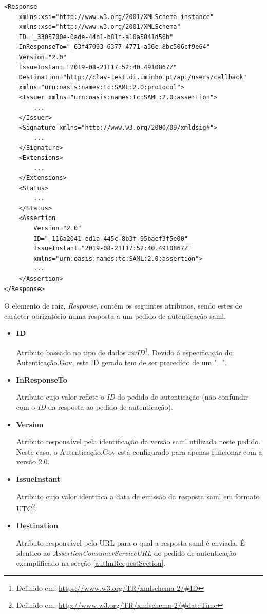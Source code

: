 \begin{lstlisting}
<Response 
    xmlns:xsi="http://www.w3.org/2001/XMLSchema-instance" 
    xmlns:xsd="http://www.w3.org/2001/XMLSchema" 
    ID="_3305700e-0ade-44b1-b81f-a10a5841d56b" 
    InResponseTo="_63f47093-6377-4771-a36e-8bc506cf9e64" 
    Version="2.0" 
    IssueInstant="2019-08-21T17:52:40.4910867Z" 
    Destination="http://clav-test.di.uminho.pt/api/users/callback"
    xmlns="urn:oasis:names:tc:SAML:2.0:protocol">
    <Issuer xmlns="urn:oasis:names:tc:SAML:2.0:assertion">
        ...
    </Issuer>
    <Signature xmlns="http://www.w3.org/2000/09/xmldsig#">
        ...
    </Signature>
    <Extensions>
        ...
    </Extensions>
    <Status>
        ...
    </Status>
    <Assertion 
        Version="2.0" 
        ID="_116a2041-ed1a-445c-8b3f-95baef3f5e00" 
        IssueInstant="2019-08-21T17:52:40.4910867Z" 
        xmlns="urn:oasis:names:tc:SAML:2.0:assertion">
        ...
    </Assertion>
</Response>
\end{lstlisting}

\vspace{-7mm}
O elemento de raiz, \emph{Response}, contém os seguintes atributos, sendo estes de carácter obrigatório numa resposta a um pedido de autenticação \gls{saml}.

\begin{itemize}
    \item \textbf{ID}
    
    Atributo baseado no tipo de dados \emph{xs:ID}\footnote{Definido em: \url{https://www.w3.org/TR/xmlschema-2/\#ID}}. Devido à especificação do Autenticação.Gov, este ID gerado tem de ser precedido de um "\_".
    
    \item \textbf{InResponseTo}
    
    Atributo cujo valor reflete o \emph{ID} do pedido de autenticação (não confundir com o \emph{ID} da resposta ao pedido de autenticação).
    
    \item \textbf{Version}
    
    Atributo responsável pela identificação da versão \gls{saml} utilizada neste pedido. Neste caso, o Autenticação.Gov está configurado para apenas funcionar com a versão 2.0.
    
    \item \textbf{IssueInstant}
    
    Atributo cujo valor identifica a data de emissão da resposta \gls{saml} em formato UTC\footnote{Definido em: \url{http://www.w3.org/TR/xmlschema-2/\#dateTime}}.
    
    \item \textbf{Destination}
    
    Atributo responsável pelo URL para o qual a resposta \gls{saml} é enviada. É identico ao \emph{AssertionConsumerServiceURL} do pedido de autenticação exemplificado na secção \ref{authnRequestSection}.
\end{itemize}

